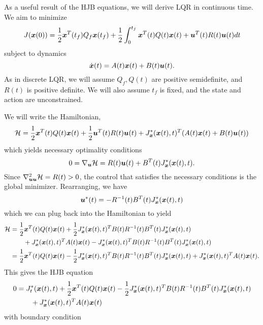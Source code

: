 As a useful result of the HJB equations, we will derive LQR in continuous time. We aim to minimize 
\begin{equation}
    J(\bm{x}(0)) = \frac{1}{2} \bm{x}^T(t_f) Q_f \bm{x}(t_f) + \frac{1}{2} \int_0^{t_f} \bm{x}^T(t) Q(t) \bm{x}(t) + \bm{u}^T(t) R(t) \bm{u}(t) dt
\end{equation}
subject to dynamics
\begin{equation}
    \dot{\bm{x}}(t) = A(t) \bm{x}(t) + B(t) \bm{u}(t).
\end{equation}
As in discrete LQR, we will assume $Q_f, Q(t)$ are positive semidefinite, and $R(t)$ is positive definite. We will also assume $t_f$ is fixed, and the state and action are unconstrained. 

We will write the Hamiltonian, 
\begin{equation}
    \mathcal{H} = \frac{1}{2} \bm{x}^T(t) Q(t) \bm{x}(t) + \frac{1}{2} \bm{u}^T(t) R(t) \bm{u}(t) + J^*_{\bm{x}}(\bm{x}(t),t)^T (A(t) \bm{x}(t) + B(t) \bm{u}(t))
\end{equation}
which yields necessary optimality conditions 
\begin{equation}
    0 = \nabla_{\bm{u}} \mathcal{H} = R(t) \bm{u}(t) + B^T(t) J^*_{\bm{x}}(\bm{x}(t),t).
\end{equation}
Since $\nabla_{\bm{u} \bm{u}}^2 \mathcal{H} = R(t) > 0$, the control that satisfies the necessary conditions is the global minimizer. Rearranging, we have
\begin{equation}
    \bm{u}^*(t) = - R^{-1}(t) B^T(t) J^*_{\bm{x}}(\bm{x}(t),t)
\end{equation}
which we can plug back into the Hamiltonian to yield
\begin{align}
    \mathcal{H} &= \frac{1}{2} \bm{x}^T(t) Q(t) \bm{x}(t) + \frac{1}{2} J^*_{\bm{x}}(\bm{x}(t),t)^T B(t) R^{-1}(t) B^T(t) J^*_{\bm{x}}(\bm{x}(t),t)\\
     &\qquad + J^*_{\bm{x}}(\bm{x}(t),t)^T A(t) \bm{x}(t) - J^*_{\bm{x}}(\bm{x}(t),t)^T B(t) R^{-1}(t) B^T(t) J^*_{\bm{x}}(\bm{x}(t),t)\nonumber\\
     &= \frac{1}{2} \bm{x}^T(t) Q(t) \bm{x}(t) - \frac{1}{2} J^*_{\bm{x}}(\bm{x}(t),t)^T B(t) R^{-1}(t) B^T(t) J^*_{\bm{x}}(\bm{x}(t),t) + J^*_{\bm{x}}(\bm{x}(t),t)^T A(t) \bm{x}(t).
\end{align}
This gives the HJB equation
\begin{align}
    0 &= J_t^*(\bm{x}(t),t) + \frac{1}{2} \bm{x}^T(t) Q(t) \bm{x}(t) - \frac{1}{2} J^*_{\bm{x}}(\bm{x}(t),t)^T B(t) R^{-1}(t) B^T(t) J^*_{\bm{x}}(\bm{x}(t),t)\\
    &\qquad + J^*_{\bm{x}}(\bm{x}(t),t)^T A(t) \bm{x}(t)\nonumber
\end{align}
with boundary condition 
